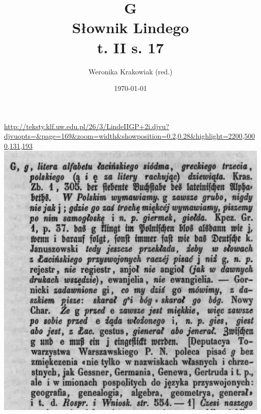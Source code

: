 \documentclass[12pt]{article}
\title{G\\ Słownik Lindego\\ t. II s. 17}
\author{Weronika Krakowiak (red.)}
\date{\today}
\begin{document}
\maketitle

\url {http://teksty.klf.uw.edu.pl/26/3/LindeIIGP+2i.djvu?djvuopts=&page=169&zoom=width&showposition=0.2,0.28&highlight=2200,5000,131,193}\\

\includegraphics[scale=0.8]{g.jpg}
\end{document}
